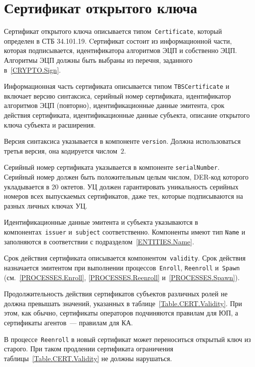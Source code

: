 \section{Сертификат открытого ключа}\label{FMT.Cert}

Сертификат открытого ключа описывается типом~\texttt{Certificate}, который 
определен в СТБ 34.101.19.
%
Cертификат состоит из информационной части, которая 
подписывается, идентификатора алгоритмов ЭЦП и собственно ЭЦП. 
Алгоритмы ЭЦП должны быть выбраны из перечня, заданного 
в~\ref{CRYPTO.Sign}. 

Информационная часть сертификата описывается типом 
\texttt{TBSCertificate} и включает версию синтаксиса, 
серийный номер сертификата, идентификатор алгоритмов ЭЦП (повторно), 
идентификационные данные эмитента, срок действия сертификата, 
идентификационные данные субъекта, описание открытого ключа 
субъекта и расширения. 

Версия синтаксиса указывается в компоненте \texttt{version}.
Должна использоваться третья версия, она кодируется числом~$2$.

Серийный номер сертификата указывается в компоненте \texttt{serialNumber}.
Серийный номер должен быть положительным целым числом, 
DER-код которого укладывается в 20 октетов.
%
УЦ должен гарантировать уникальность серийных 
номеров всех выпускаемых сертификатов, даже тех, которые 
подписываются на разных личных ключах УЦ.

Идентификационные данные эмитента и субъекта указываются в
компонентах~\texttt{issuer} и~\texttt{subject} соответственно. Компоненты
имеют тип \texttt{Name} и заполняются в соответствии с
подразделом~\ref{ENTITIES.Name}.

Срок действия сертификата описывается компонентом~\texttt{validity}. 
%
Срок действия назначается эмитентом при выполнении 
процессов~\texttt{Enroll}, \texttt{Reenroll} и~\texttt{Spawn} 
(см.~\ref{PROCESSES.Enroll}, \ref{PROCESSES.Reenroll} 
и~\ref{PROCESSES.Spawn}).

Продолжительность действия сертификатов субъектов различных ролей
не должна превышать значений, указанных в таблице~\ref{Table.CERT.Validity}. 
%
При этом, как обычно, сертификаты операторов подчиняются правилам для ЮП, 
а сертификаты агентов~--- правилам для КА.

В процессе~\texttt{Reenroll} в новый сертификат может переноситься открытый 
ключ из старого. При таком продлении сертификата ограничения
таблицы~\ref{Table.CERT.Validity} не должны нарушаться.


